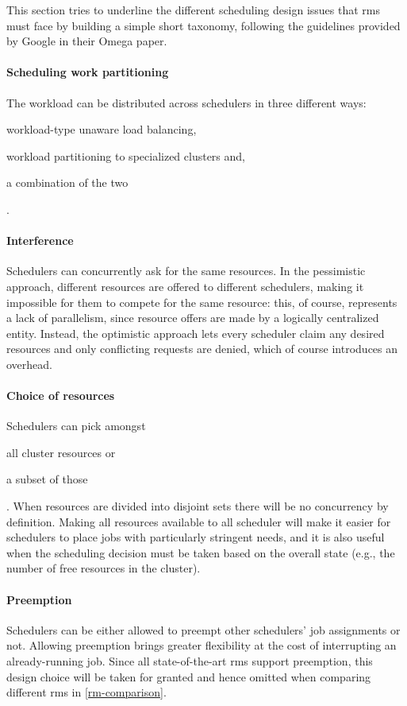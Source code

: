 This section tries to underline the different scheduling design issues that \glspl{rm} must face by building a simple short taxonomy, following the guidelines provided by Google in their Omega \cite{omega} paper.

\paragraph{Scheduling work partitioning}
The workload can be distributed across schedulers in three different ways:
\begin{mylist}
    \item workload-type unaware load balancing,
    \item workload partitioning to specialized clusters and,
    \item a combination of the two
\end{mylist}.

\paragraph{Interference}
Schedulers can concurrently ask for the same resources.
In the pessimistic approach, different resources are offered to different schedulers, making it impossible for them to compete for the same resource: this, of course, represents a lack of parallelism, since resource offers are made by a logically centralized entity.
Instead, the optimistic approach lets every scheduler claim any desired resources and only conflicting requests are denied, which of course introduces an overhead.

\paragraph{Choice of resources}
Schedulers can pick amongst
\begin{mylist}
    \item all cluster resources or 
    \item a subset of those
\end{mylist}.
When resources are divided into disjoint sets there will be no concurrency by definition.
Making all resources available to all scheduler will make it easier for schedulers to place jobs with particularly stringent needs, and it is also useful when the scheduling decision must be taken based on the overall state (e.g., the number of free resources in the cluster).

\paragraph{Preemption}
Schedulers can be either allowed to preempt other schedulers' job assignments or not.
Allowing preemption brings greater flexibility at the cost of interrupting an already-running job.
Since all state-of-the-art \glspl{rm} support preemption, this design choice will be taken for granted and hence omitted when comparing different \glspl{rm} in \autoref{rm-comparison}.

